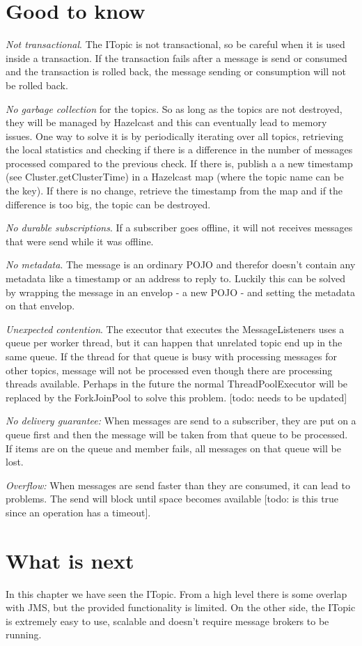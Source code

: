 \section{Good to know}

\emph{Not transactional}. The ITopic is not transactional, so be careful when it is used inside a transaction. If the transaction fails after a message is send or consumed and the transaction is rolled back, the message sending or consumption will not be rolled back.

\emph{No garbage collection} for the topics. So as long as the topics are not destroyed, they will be managed by Hazelcast and this can eventually lead to memory issues. One way to solve it is by periodically iterating over all topics, retrieving the local statistics and checking if there is a difference in the number of messages processed compared to the previous check. If there is, publish a a new timestamp (see Cluster.getClusterTime) in a Hazelcast map (where the topic name can be the key). If there is no change, retrieve the timestamp from the map and if the difference is too big, the topic can be destroyed.

\emph{No durable subscriptions}. If a subscriber goes offline, it will not receives messages that were send while it was offline.

\emph{No metadata}. The message is an ordinary POJO and therefor doesn't contain any metadata like a timestamp or an address to reply to. Luckily this can be solved by wrapping the message in an envelop - a new POJO - and setting the metadata on that envelop.

\emph{Unexpected contention}. The executor that executes the MessageListeners uses a queue per worker thread, but it can happen that unrelated topic end up in the same queue. If the thread for that queue is busy with processing messages for other topics, message will not be processed even though there are processing threads available. Perhaps in the future the normal ThreadPoolExecutor will be replaced by the ForkJoinPool to solve this problem. [todo: needs to be updated]

\emph{No delivery guarantee:} When messages are send to a subscriber, they are put on a queue first and then the message will be taken from that queue to be processed. If items are on the queue and member fails, all messages on that queue will be lost.

\emph{Overflow:} When messages are send faster than they are consumed, it can lead to problems. The send will block until space becomes available [todo: is this true since an operation has a timeout]. 

\section{What is next}
In this chapter we have seen the ITopic. From a high level there is some overlap with JMS, but the provided functionality is limited. On the other side, the ITopic is extremely easy to use, scalable and doesn't require message brokers to be running.
